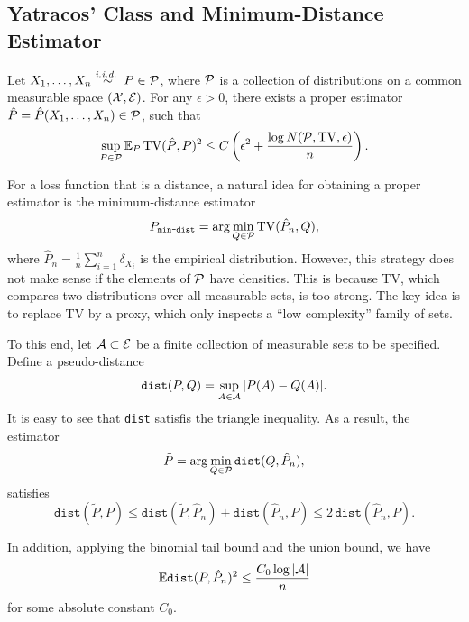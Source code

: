 \subsection{Yatracos' Class and Minimum-Distance Estimator}  

\begin{theorem}
    Let $X_1,\dots,X_n\stackrel{\textit{i.i.d.~}}{\sim} P\in\mathcal{P}$,
    where $\mathcal{P}$ is a collection of distributions on a common measurable space $(\mathcal{X},\mathcal{E})$.
    For any $\epsilon>0$, there exists a proper estimator $\hat{P}=\hat{P}(X_1,\dots,X_n)\in\mathcal{P}$, such that 
    \[\sup_{P\in\mathcal{P}}\mathbb{E}_{P}\operatorname{TV}(\hat{P},P)^2\leq C\left(\epsilon^2+\frac{\log N(\mathcal{P},\operatorname{TV},\epsilon)}{n}\right).\]
\end{theorem}

For a loss function that is a distance, a natural idea for obtaining a proper estimator is the minimum-distance estimator
\[P_{\texttt{min-dist}}=\arg\min_{Q\in\mathcal{P}}\operatorname{TV}(\hat{P}_n,Q),\]
where $\hat{P}_n=\frac{1}{n}\sum_{i=1}^{n}\delta_{X_i}$ is the empirical distribution.
However, this strategy does not make sense if the elements of $\mathcal{P}$ have densities.
This is because TV, which compares two distributions over all measurable sets, is too strong.
The key idea is to replace TV by a proxy, which only inspects a ``low complexity'' family of sets.

To this end, let $\mathcal{A}\subset\mathcal{E}$ be a finite collection of measurable sets to be specified.
Define a pseudo-distance 
\[\texttt{dist}(P,Q)=\sup_{A\in\mathcal{A}}|P(A)-Q(A)|.\]
It is easy to see that \texttt{dist} satisfis the triangle inequality. As a result, the estimator
\[\tilde{P}=\arg\min_{Q\in\mathcal{P}}\texttt{dist}(Q,\hat{P}_n),\]
satisfies
\[\texttt{dist}(\tilde{P},P)\leq \texttt{dist}(\tilde{P},\hat{P}_n)+\texttt{dist}(\hat{P}_n,P)\leq 2\,\texttt{dist}(\hat{P}_n,P).\]

In addition, applying the binomial tail bound and the union bound, we have
\[\mathbb{E} \texttt{dist}(P,\hat{P}_n)^2\leq\frac{C_0\log|\mathcal{A}|}{n}\]
for some absolute constant $C_0$.

